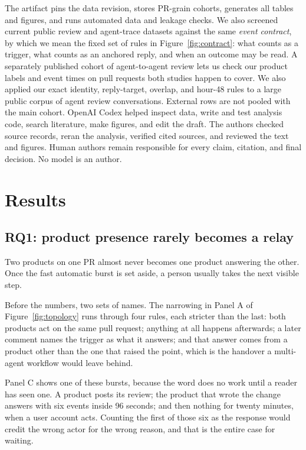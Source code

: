 \documentclass[lineno,pdflatex,sn-basic]{sn-jnl}
\begin{document}
The artifact pins the data revision, stores PR-grain cohorts, generates all
tables and figures, and runs automated data and leakage checks. We also screened
current public review and agent-trace datasets against the same \emph{event
contract}, by which we mean the fixed set of rules in Figure~\ref{fig:contract}:
what counts as a trigger, what counts as an anchored reply, and when an outcome
may be read.
A separately published cohort of agent-to-agent review lets us check our product
labels and event times on pull requests both studies happen to cover. We also
applied our exact identity, reply-target, overlap, and hour-48 rules to a large
public corpus of agent review conversations. External rows are not pooled with the main cohort.
OpenAI Codex helped inspect data, write and test analysis code, search
literature, make figures, and edit the draft. The authors checked source
records, reran the analysis, verified cited sources, and reviewed the text and
figures. Human authors remain responsible for every claim, citation, and final
decision. No model is an author.

\section{Results}\label{sec:results}

\subsection{RQ1: product presence rarely becomes a relay}

Two products on one PR almost never becomes one product answering the other.
Once the fast automatic burst is set aside, a person usually takes the next
visible step.

Before the numbers, two sets of names. The narrowing in Panel A of
Figure~\ref{fig:topology} runs through four rules, each stricter than the last:
both products act on the same pull request; anything at all happens afterwards; a
later comment names the trigger as what it answers; and that answer comes from a
product other than the one that raised the point, which is the handover a
multi-agent workflow would leave behind.

Panel C shows one of these bursts, because the word does no work until a reader
has seen one. A product posts its review; the product that wrote the change
answers with six events inside 96 seconds; and then nothing for twenty
minutes, when a user account acts. Counting the first of those six as the response
would credit the wrong actor for the wrong reason, and that is the entire case for
waiting.
\end{document}
